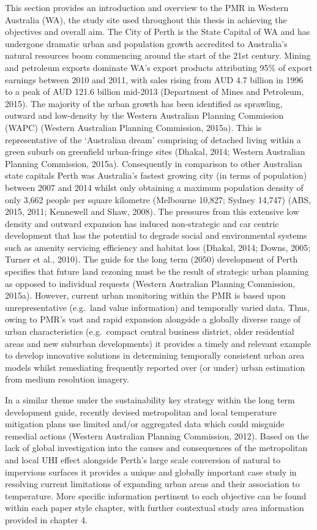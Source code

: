 \documentclass[]{book}
\begin{document}
This section provides an introduction and overview to the PMR in Western
Australia (WA), the study site used throughout this thesis in achieving
the objectives and overall aim. The City of Perth is the State Capital
of WA and has undergone dramatic urban and population growth accredited
to Australia's natural resources boom commencing around the start of the
21st century. Mining and petroleum exports dominate WA's export products
attributing 95\% of export earnings between 2010 and 2011, with sales
rising from AUD 4.7 billion in 1996 to a peak of AUD 121.6 billion
mid-2013 (Department of Mines and Petroleum, 2015). The majority of the
urban growth has been identified as sprawling, outward and low-density
by the Western Australian Planning Commission (WAPC) (Western Australian
Planning Commission, 2015a). This is representative of the `Australian
dream' comprising of detached living within a green suburb on greenfield
urban-fringe sites (Dhakal, 2014; Western Australian Planning
Commission, 2015a). Consequently in comparison to other Australian state
capitals Perth was Australia's fastest growing city (in terms of
population) between 2007 and 2014 whilst only obtaining a maximum
population density of only 3,662 people per square kilometre (Melbourne
10,827; Sydney 14,747) (ABS, 2015, 2011; Kennewell and Shaw, 2008). The
pressures from this extensive low density and outward expansion has
induced non-strategic and car centric development that has the potential
to degrade social and environmental systems such as amenity servicing
efficiency and habitat loss (Dhakal, 2014; Downs, 2005; Turner et al.,
2010). The guide for the long term (2050) development of Perth specifies
that future land rezoning must be the result of strategic urban planning
as opposed to individual requests (Western Australian Planning
Commission, 2015a). However, current urban monitoring within the PMR is
based upon unrepresentative (e.g.~land value information) and temporally
varied data. Thus, owing to PMR's vast and rapid expansion alongside a
globally diverse range of urban characteristics (e.g.~compact central
business district, older residential areas and new suburban
developments) it provides a timely and relevant example to develop
innovative solutions in determining temporally consistent urban area
models whilst remediating frequently reported over (or under) urban
estimation from medium resolution imagery.

In a similar theme under the sustainability key strategy within the long
term development guide, recently devised metropolitan and local
temperature mitigation plans use limited and/or aggregated data which
could misguide remedial actions (Western Australian Planning Commission,
2012). Based on the lack of global investigation into the causes and
consequences of the metropolitan and local UHI effect alongside Perth's
large scale conversion of natural to impervious surfaces it provides a
unique and globally important case study in resolving current
limitations of expanding urban areas and their association to
temperature. More specific information pertinent to each objective can
be found within each paper style chapter, with further contextual study
area information provided in chapter 4.
\end{document}
